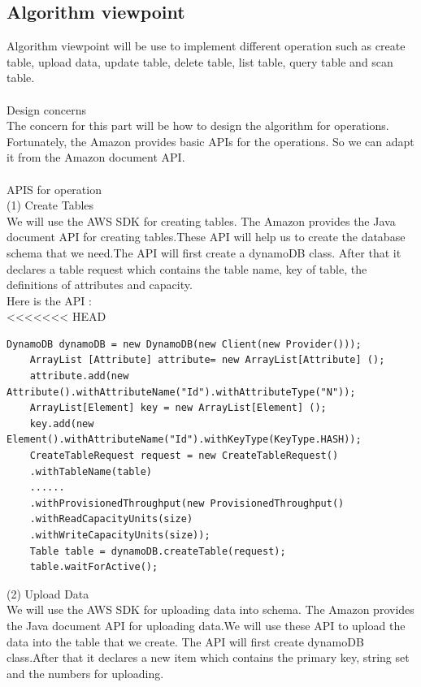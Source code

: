     \subsection{Algorithm viewpoint}
    Algorithm viewpoint will be use to implement different operation such as create table, upload data, update table, delete table, list table, query table and scan table.\\
\\
    Design concerns\\
    The concern for this part will be how to design the algorithm for operations. Fortunately, the Amazon provides basic APIs for the operations. So we can adapt it from the Amazon document API.\\
\\
    APIS for operation\\
    (1) Create Tables\\
    We will use the AWS SDK for creating tables. The Amazon provides the Java document API for creating tables.These API will help us to create the database schema that we need.The API will first create a dynamoDB class. After that it declares a table request which contains the table name, key of table, the definitions of attributes and capacity.\\
    Here is the API\cite{w1} :\\
<<<<<<< HEAD
    \begin{lstlisting}[caption=API for create tables]
	DynamoDB dynamoDB = new DynamoDB(new Client(new Provider()));
	ArrayList [Attribute] attribute= new ArrayList[Attribute] ();
	attribute.add(new Attribute().withAttributeName("Id").withAttributeType("N"));
  	ArrayList[Element] key = new ArrayList[Element] ();
 	key.add(new  Element().withAttributeName("Id").withKeyType(KeyType.HASH));
	CreateTableRequest request = new CreateTableRequest()
	.withTableName(table)
	......
	.withProvisionedThroughput(new ProvisionedThroughput()
	.withReadCapacityUnits(size)
	.withWriteCapacityUnits(size));
	Table table = dynamoDB.createTable(request);
	table.waitForActive();
  \end{lstlisting}
    (2) Upload Data\\
    We will use the AWS SDK for uploading data into schema. The Amazon provides the Java document API for uploading data.We will use these API to upload the data into the table that we create. The API will first create dynamoDB class.After that it declares a new item which contains the primary key, string set and the numbers for uploading.\\
